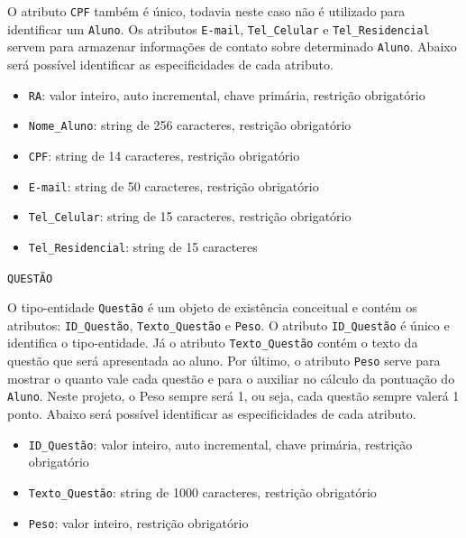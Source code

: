 \documentclass[12pt,a4paper]{article}
\begin{document}
O atributo {\texttt{CPF}} também é único, todavia neste caso não é utilizado para identificar um \texttt{Aluno}. Os atributos {\texttt{E-mail}}, {\texttt{Tel\_Celular} e \texttt{Tel\_Residencial}} servem para armazenar informações de contato sobre determinado \texttt{Aluno}. Abaixo será possível identificar as especificidades de cada atributo.\\

\begin{itemize}
    \item {\texttt{RA}}: valor inteiro, auto incremental, chave primária, restrição obrigatório
    \item {\texttt{Nome\_Aluno}}: string de 256 caracteres, restrição obrigatório
    \item \texttt{CPF}: string de 14 caracteres, restrição obrigatório
    \item \texttt{E-mail}: string de 50 caracteres, restrição obrigatório
    \item \texttt{Tel\_Celular}: string de 15 caracteres, restrição obrigatório
    \item \texttt{Tel\_Residencial}: string de 15 caracteres
\end{itemize}

\vspace{0.5cm}
\begin{center}
    \texttt{QUESTÃO}
\end{center}

O tipo-entidade \texttt{Questão} é um objeto de existência conceitual e contém os atributos: \texttt{ID\_Questão},  \texttt{Texto\_Questão} e \texttt{Peso}. O atributo \texttt{ID\_Questão} é único e identifica o tipo-entidade. Já o atributo \texttt{Texto\_Questão} contém o texto da questão que será apresentada ao aluno. Por último, o atributo \texttt{Peso} serve para mostrar o quanto vale cada questão e para o auxiliar no cálculo da pontuação do \texttt{Aluno}. Neste projeto, o Peso sempre será 1, ou seja, cada questão sempre valerá 1 ponto. Abaixo será possível identificar as especificidades de cada atributo.\\

\begin{itemize}
    \item \texttt{ID\_Questão}: valor inteiro, auto incremental, chave primária, restrição obrigatório
    \item \texttt{Texto\_Questão}: string de 1000 caracteres, restrição obrigatório
    \item \texttt{Peso}: valor inteiro, restrição obrigatório
\end{itemize}
\end{document}

